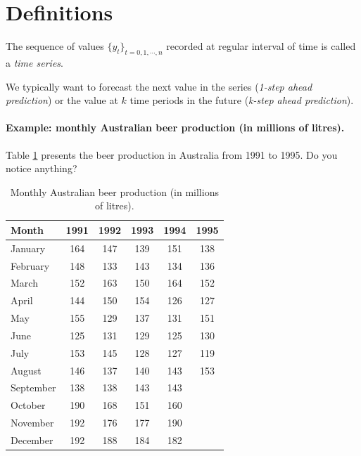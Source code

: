 \documentclass[a4paper,11pt,oneside,onecolumn]{book}
\begin{document}
\section{Definitions}


\begin{definition}
 The sequence of values  $\lbrace y_t \rbrace_{t=0,1,\cdots,n}$ recorded   at regular interval of time is called a {\it time series}.
\end{definition}

We typically want to forecast the next value in the series
({\it 1-step ahead prediction}) or the value at $k$ time periods in
the future ({\it k-step ahead prediction}).

\paragraph{Example: monthly Australian beer production (in millions of
 litres).} Table \ref{tab:beer:data} presents the beer production in Australia from 1991 to 1995.
Do you notice anything?

\begin{table}[!h]
\begin{center}
\begin{tabular}{lccccc}
{\bf Month} & {\bf 1991} & {\bf 1992} & {\bf 1993} & {\bf 1994} &
{\bf 1995} \\ \hline January & 164 & 147 & 139 & 151 & 138 \\
February & 148 & 133 & 143 & 134 & 136 \\ March & 152 & 163 & 150 & 164 & 152 \\
April & 144 & 150 & 154 & 126 & 127 \\ May & 155 & 129 & 137 & 131 & 151 \\
June & 125 & 131 & 129 & 125 & 130 \\ July & 153 & 145 & 128 & 127 & 119 \\
August & 146 & 137 & 140 & 143 & 153 \\ September & 138 & 138 & 143 & 143 & \\
October & 190 & 168 & 151 & 160 &  \\ November & 192 & 176 & 177 & 190 &  \\
December & 192 & 188 & 184 & 182 &  \\ \hline
\end{tabular}
\caption{Monthly Australian beer production (in millions of  litres).}\label{tab:beer:data}
\end{center}
\end{table}
\end{document}
